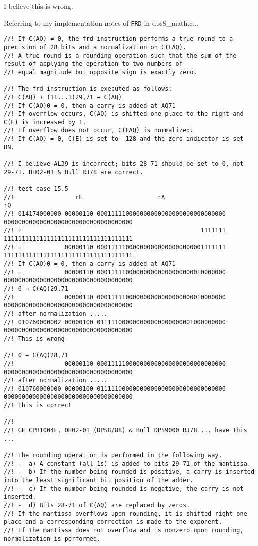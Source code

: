 \documentclass[notitlepage]{report}
\begin{document}
I believe this is wrong.


Referring to my implementation notes of \texttt{FRD} in dps8\_math.c...

\begin{verbatim}
//! If C(AQ) ≠ 0, the frd instruction performs a true round to a precision of 28 bits and a normalization on C(EAQ).
//! A true round is a rounding operation such that the sum of the result of applying the operation to two numbers of
//! equal magnitude but opposite sign is exactly zero.

//! The frd instruction is executed as follows:
//! C(AQ) + (11...1)29,71 → C(AQ)
//! If C(AQ)0 = 0, then a carry is added at AQ71
//! If overflow occurs, C(AQ) is shifted one place to the right and C(E) is increased by 1.
//! If overflow does not occur, C(EAQ) is normalized.
//! If C(AQ) = 0, C(E) is set to -128 and the zero indicator is set ON.

//! I believe AL39 is incorrect; bits 28-71 should be set to 0, not 29-71. DH02-01 & Bull RJ78 are correct.

//! test case 15.5
//!                 rE                     rA                                     rQ
//! 014174000000 00000110 000111110000000000000000000000000000 000000000000000000000000000000000000
//! +                                                  1111111 111111111111111111111111111111111111
//! =            00000110 000111110000000000000000000001111111 111111111111111111111111111111111111
//! If C(AQ)0 = 0, then a carry is added at AQ71
//! =            00000110 000111110000000000000000000010000000 000000000000000000000000000000000000
//! 0 → C(AQ)29,71
//!              00000110 000111110000000000000000000010000000 000000000000000000000000000000000000
//! after normalization .....
//! 010760000002 00000100 011111000000000000000000001000000000 000000000000000000000000000000000000
//! This is wrong

//! 0 → C(AQ)28,71
//!              00000110 000111110000000000000000000000000000 000000000000000000000000000000000000
//! after normalization .....
//! 010760000000 00000100 011111000000000000000000000000000000 000000000000000000000000000000000000
//! This is correct

//!
//! GE CPB1004F, DH02-01 (DPS8/88) & Bull DPS9000 RJ78 ... have this ...

//! The rounding operation is performed in the following way.
//! -  a) A constant (all 1s) is added to bits 29-71 of the mantissa.
//! -  b) If the number being rounded is positive, a carry is inserted into the least significant bit position of the adder.
//! -  c) If the number being rounded is negative, the carry is not inserted.
//! -  d) Bits 28-71 of C(AQ) are replaced by zeros.
//! If the mantissa overflows upon rounding, it is shifted right one place and a corresponding correction is made to the exponent.
//! If the mantissa does not overflow and is nonzero upon rounding, normalization is performed.


\end{verbatim}
\end{document}
